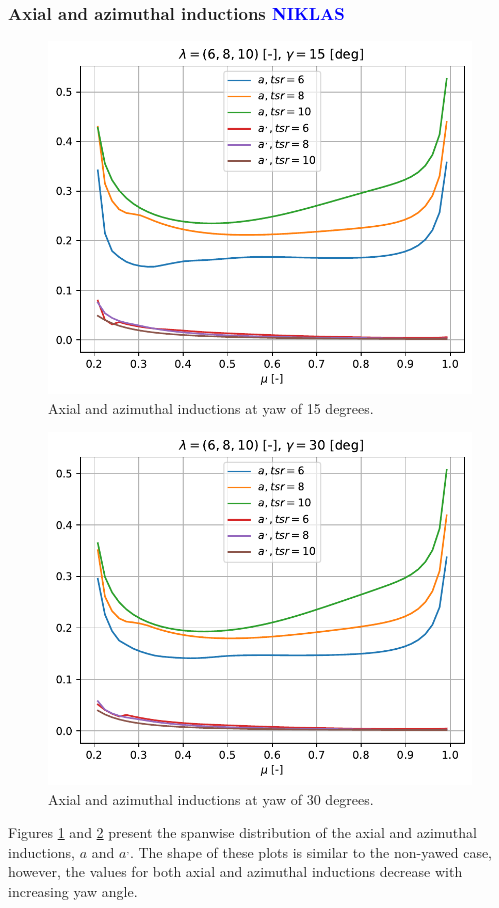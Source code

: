 \subsubsection{\textbf{Axial and azimuthal inductions} \textcolor{blue}{NIKLAS}}
\begin{figure}[htbp]
	\centering
	\includegraphics[height=0.45\textheight]{./img/yaw/a_aip-yaw_15.pdf}
	\caption{Axial and azimuthal inductions at yaw of 15 degrees.}
	\label{img:yaw-aap-15}
\end{figure}
\begin{figure}[htbp]
	\centering
	\includegraphics[height=0.45\textheight]{./img/yaw/a_aip-yaw_30.pdf}
	\caption{Axial and azimuthal inductions at yaw of 30 degrees.}
	\label{img:yaw-aap-30}
\end{figure}
Figures \ref{img:yaw-aap-15} and \ref{img:yaw-aap-30} present the spanwise distribution of the axial and azimuthal inductions, $a$ and $a^,$. The shape of these plots is similar to the non-yawed case, however, the values for both axial and azimuthal inductions decrease with increasing yaw angle.

